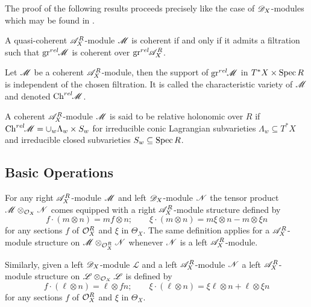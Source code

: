The proof of the following results proceeds precisely like the case of $\mathscr{D}_X$-modules which may be found in \cite[Chapter 2]{hotta2007d}.
\begin{proposition}
    A quasi-coherent $\mathscr{A}_X^R$-module $\mathscr{M}$ is coherent if and only if it admits a filtration such that $\operatorname{gr}^{rel}\mkern-5mu \mathscr{M}$ is coherent over $\operatorname{gr}^{rel}\mkern-5mu \mathscr{A}_X^R$.
\end{proposition}
\begin{proposition}
    Let $\mathscr{M}$ be a coherent $\mathscr{A}_X^R$-module, then the support of $\operatorname{gr}^{rel}\mkern-5mu \mathscr{M}$ in $T^*X \times \operatorname{Spec} R$ is independent of the chosen filtration. It is called the characteristic variety of $\mathscr{M}$ and denoted $\operatorname{Ch}^{rel}\mkern-5mu \mathscr{M}$.
\end{proposition}

A coherent $\mathscr{A}_X^R$-module $\mathscr{M}$ is said to be relative holonomic over $R$ if $\operatorname{Ch}^{rel}\mkern-5mu \mathscr{M} = \cup_w \Lambda_w \times S_w$
for irreducible conic Lagrangian subvarieties $\Lambda_w\subseteq T^*X$ and irreducible closed subvarieties $S_w\subseteq \operatorname{Spec} R$.
\subsection{Basic Operations}
For any right $\mathscr{A}_{X}^R$-module $\mathscr{M}$ and left $\mathscr{D}_X$-module $\mathscr{N}$ the tensor product $\mathscr{M} \otimes_{\mathcal{O}_X} \mathscr{N}$ comes equipped with a right $\mathscr{A}_X^R$-module structure defined by
$$f\cdot (m\otimes n) = mf \otimes n; \qquad \xi \cdot (m\otimes n) = m\xi \otimes n - m\otimes \xi n $$
for any sections $f$ of $\mathcal{O}_X^R$ and $\xi$ in $\Theta_X$. The same definition applies for a $\mathscr{A}_X^R$-module structure on $\mathscr{M}\otimes_{\mathcal{O}_X^R} \mathscr{N}$ whenever $\mathscr{N}$ is a left $\mathscr{A}_X^R$-module.

Similarly, given a left $\mathscr{D}_X$-module $\mathscr{L}$ and a left $\mathscr{A}_X^R$-module $\mathscr{N}$ a left $\mathscr{A}_X^R$-module structure on $\mathscr{L} \otimes_{\mathcal{O}_X} \mathscr{L}$ is defined by
$$f \cdot (\ell\otimes n) =\ell \otimes fn; \qquad \xi \cdot (\ell\otimes n ) = \xi \ell \otimes n + \ell \otimes \xi n$$
for any sections $f$ of $\mathcal{O}_X^R$ and $\xi$ in $\Theta_X$.

